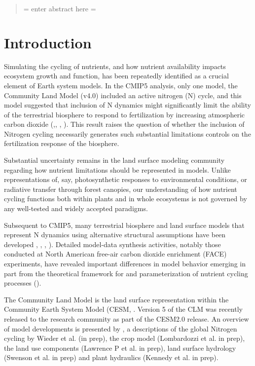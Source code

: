 \documentclass[draft,linenumbers]{agujournal}
\begin{document}
\begin{abstract}
= enter abstract here =
\end{abstract}

\section{Introduction}

Simulating the cycling of nutrients, and how nutrient availability impacts ecosystem growth and function, has been repeatedly identified as a crucial element of Earth system models. In the CMIP5 analysis, only one model, the Community Land Model (v4.0) included an active nitrogen (N) cycle, and this model suggested that inclusion of N dynamics might significantly limit the ability of the terrestrial biosphere to respond to fertilization by increasing atmospheric carbon dioxide (\cite{friedlingstein2006},\cite{friedlingstein2014}, \cite{arora2013}, ).  This result raises the question of whether the inclusion of Nitrogen cycling necessarily generates such substantial limitations controls on the fertilization response of the biosphere. 

Substantial uncertainty remains in the land surface modeling community regarding how nutrient limitations should be represented in models. Unlike representations of, say, photosynthetic responses to environmental conditions, or radiative transfer through forest canopies, our understanding of how nutrient cycling functions both within plants and in whole ecosystems is not governed by any well-tested and widely accepted paradigms.  

Subsequent to CMIP5, many terrestrial biosphere and land surface models that represent N dynamics using alternative structural assumptions have been developed \cite{zaehle2010},  \cite{goll2012}, \cite{smith2014}, \cite{wang2007}). Detailed model-data synthesis activities, notably those conducted at North American free-air carbon dioxide enrichment (FACE) experiments, have revealed important differences in model behavior emerging in part from the theoretical framework for and parameterization of nutrient cycling processes (\cite{zaehle2014}).  

The Community Land Model is the land surface representation within the Community Earth System Model (CESM, \cite{hurrell2013}.  Version 5 of the CLM was recently released to the research community as part of the CESM2.0 release. An overview of model developments is presented by \cite{lawrence2018}, a descriptions of the global Nitrogen cycling by Wieder et al. (in prep), the crop model (Lombardozzi et al. in prep), the land use components (Lawrence P et al. in prep), land surface hydrology (Swenson et al. in prep) and plant hydraulics (Kennedy et al. in prep). 
\end{document}
